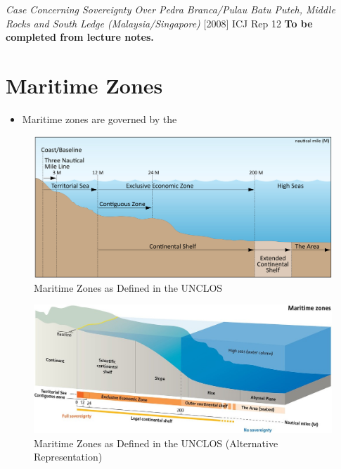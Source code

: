 \begin{casedetails}{\textit{Case Concerning Sovereignty Over Pedra Branca/Pulau Batu Puteh, Middle Rocks and South Ledge (Malaysia/Singapore)} [2008] ICJ Rep 12}
    \flushleft
    \textbf{To be completed from lecture notes.}
\end{casedetails}

\section{Maritime Zones}
\begin{itemize}
    \item Maritime zones are governed by the 
\end{itemize}

\begin{figure}[H]
    \centering
    \includegraphics[width=1\textwidth]{Images/Maritime Zones.png}
    \caption{Maritime Zones as Defined in the UNCLOS}
    \label{fig:Maritime Zones}
\end{figure}

\begin{figure}[H]
    \centering
    \includegraphics[width=1\textwidth]{Images/UNCLOS Maritime Zones.jpeg}
    \caption{Maritime Zones as Defined in the UNCLOS (Alternative Representation)}
    \label{fig:UNCLOS Maritime Zones}
\end{figure}

